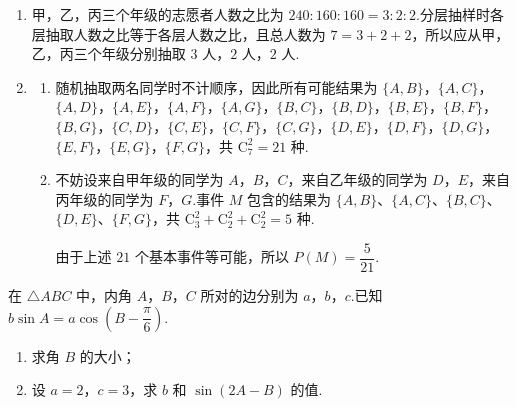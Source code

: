 \begin{solution}
\begin{enumerate}
\item 甲，乙，丙三个年级的志愿者人数之比为 \(240:160:160=3:2:2\).分层抽样时各层抽取人数之比等于各层人数之比，且总人数为 \(7=3+2+2\)，所以应从甲，乙，丙三个年级分别抽取 \(3\) 人，\(2\) 人，\(2\) 人.

\item
\begin{enumerate}
\item 随机抽取两名同学时不计顺序，因此所有可能结果为
\(\{A,B\}\)，\(\{A,C\}\)，\(\{A,D\}\)，\(\{A,E\}\)，\(\{A,F\}\)，\(\{A,G\}\)，\(\{B,C\}\)，\(\{B,D\}\)，\(\{B,E\}\)，\(\{B,F\}\)，\(\{B,G\}\)，\(\{C,D\}\)，\(\{C,E\}\)，\(\{C,F\}\)，\(\{C,G\}\)，\(\{D,E\}\)，\(\{D,F\}\)，\(\{D,G\}\)，\(\{E,F\}\)，\(\{E,G\}\)，\(\{F,G\}\)，共 \(\mathrm C_7^2=21\) 种.

\item 不妨设来自甲年级的同学为 \(A\)，\(B\)，\(C\)，来自乙年级的同学为 \(D\)，\(E\)，来自丙年级的同学为 \(F\)，\(G\).事件 \(M\) 包含的结果为 \(\{A,B\}\)、\(\{A,C\}\)、\(\{B,C\}\)、\(\{D,E\}\)、\(\{F,G\}\)，共 \(\mathrm C_3^2+\mathrm C_2^2+\mathrm C_2^2=5\) 种.

由于上述 \(21\) 个基本事件等可能，所以
\(P(M)=\dfrac{5}{21}\).
\end{enumerate}
\end{enumerate}
\end{solution}

\begin{problem}

在 \(\triangle ABC\) 中，内角 \(A\)，\(B\)，\(C\) 所对的边分别为 \(a\)，\(b\)，\(c\).已知 \(b\sin A=a\cos\!\left(B-\dfrac{\pi}{6}\right)\).

\begin{enumerate}
\item 求角 \(B\) 的大小；
\item 设 \(a=2\)，\(c=3\)，求 \(b\) 和 \(\sin(2A-B)\) 的值.
\end{enumerate}
\end{problem}

